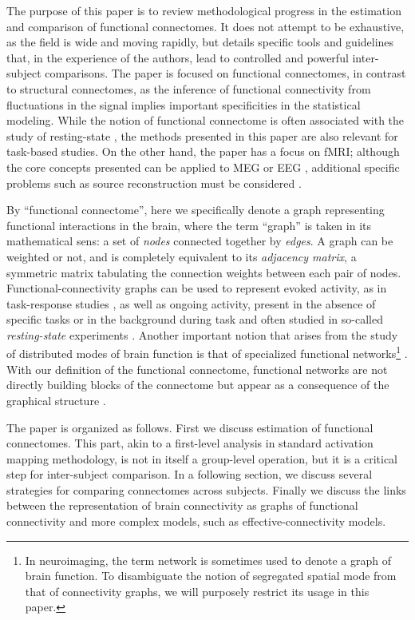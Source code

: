 \documentclass[5p]{elsarticle}
\begin{document}
The purpose of this paper is to review methodological progress in the
estimation and comparison of functional connectomes. It does not attempt
to be exhaustive, as the field is wide and moving rapidly, but details
specific tools and guidelines that, in the experience of the authors,
lead to controlled and powerful inter-subject comparisons. The paper is
focused on functional connectomes, in contrast to structural connectomes,
as the inference of functional connectivity from fluctuations in the
signal implies important specificities in the statistical modeling. While 
the notion of functional
connectome is often associated with the study of resting-state
\cite{biswal2010}, the methods presented in this paper are also relevant
for task-based studies. On the other hand, the paper has a focus on fMRI;
although the core concepts presented can be applied to MEG or EEG
\cite{stam2004}, additional specific problems such as source
reconstruction must be considered \cite{schoffelen2009}.

By ``functional connectome'', here we specifically denote a graph
representing functional interactions in the brain, where the term
``graph'' is taken in its mathematical sens: a set of \emph{nodes}
connected together by \emph{edges}. A graph can be weighted or not, and
is completely equivalent to its \emph{adjacency matrix}, a symmetric
matrix tabulating the connection weights between each pair of nodes.
Functional-connectivity graphs can be used to represent evoked activity,
as in task-response studies \cite{mcintosh2000}, as well as
ongoing activity, present in the absence of specific tasks or in 
the background during task and often studied in so-called \emph{resting-state}
experiments \cite{raichle2010}. Another important notion that arises from
the study of distributed modes of brain function is that of specialized
functional networks\footnote{In neuroimaging, the term network is
sometimes used to denote a graph of brain function. To disambiguate the
notion of segregated spatial mode \cite{fox2005} from that of
connectivity graphs, we will purposely restrict its usage in this
paper.} \cite{fox2005}. With our definition of the functional connectome, functional
networks are not directly building blocks of the connectome but appear
as a consequence of the graphical structure
\cite{varoquaux2010c,varoquaux2012}.

The paper is organized as follows. First we discuss estimation of
functional connectomes. This part, akin to a first-level analysis in
standard activation mapping methodology, is not in itself a group-level
operation, but it is a critical step for inter-subject comparison.
In a following section, we discuss several strategies for comparing
connectomes across subjects. Finally we discuss the links between the
representation of brain connectivity as graphs of functional connectivity
and more complex models, such as effective-connectivity models.
\end{document}
